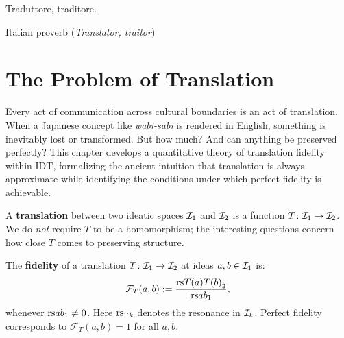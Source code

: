 \epigraph{Traduttore, traditore.}{Italian proverb (\textit{Translator, traitor})}

\section{The Problem of Translation}

Every act of communication across cultural boundaries is an act of translation.
When a Japanese concept like \emph{wabi-sabi} is rendered in English, something
is inevitably lost or transformed.  But how much?  And can anything be preserved
perfectly?  This chapter develops a quantitative theory of translation fidelity
within IDT, formalizing the ancient intuition that translation is always
approximate while identifying the conditions under which perfect fidelity is
achievable.

\begin{definition}
\label{def:translation-map}
A \textbf{translation} between two ideatic spaces $\mathcal{I}_1$ and $\mathcal{I}_2$ is a
function $T\colon \mathcal{I}_1 \to \mathcal{I}_2$.  We do \emph{not} require $T$ to be
a homomorphism; the interesting questions concern how close $T$ comes to
preserving structure.
\end{definition}

\begin{definition}
\label{def:translation-fidelity}
The \textbf{fidelity} of a translation $T\colon \mathcal{I}_1 \to \mathcal{I}_2$ at ideas
$a, b \in \mathcal{I}_1$ is:
\[
  \mathcal{F}_T(a, b) := \frac{\mathrm{rs}{T(a)}{T(b)}_2}{\mathrm{rs}{a}{b}_1},
\]
whenever $\mathrm{rs}{a}{b}_1 \neq 0$.  Here $\mathrm{rs}{\cdot}{\cdot}_k$ denotes the
resonance in $\mathcal{I}_k$.  Perfect fidelity corresponds to $\mathcal{F}_T(a,b) = 1$
for all $a, b$.
\end{definition}

